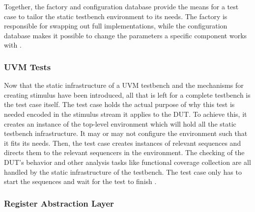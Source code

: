 Together, the factory and configuration database provide the means for a test case to tailor the static testbench
environment to its needs. The factory is responsible for swapping out full implementations, while the configuration
database makes it possible to change the parameters a specific component works with \cite[Ch. 4.3]{mehta2018asic}.

\subsubsection{UVM Tests} %

Now that the static infrastructure of a UVM testbench and the mechanisms for creating stimulus have been introduced,
all that is left for a complete testbench is the test case itself. The test case holds the actual purpose of why this
test is needed encoded in the stimulus stream it applies to the DUT. To achieve this, it creates an instance of the
top-level environment which will hold all the static testbench infrastructure. It may or may not configure the
environment such that it fits its needs. Then, the test case creates instances of relevant sequences and directs them
to the relevant sequencers in the environment. The checking of the DUT's behavior and other analysis tasks like
functional coverage collection are all handled by the static infrastructure of the testbench. The test case only has
to start the sequences and wait for the test to finish \cite[Ch. 4.3]{mehta2018asic}.

\subsubsection{Register Abstraction Layer} %

